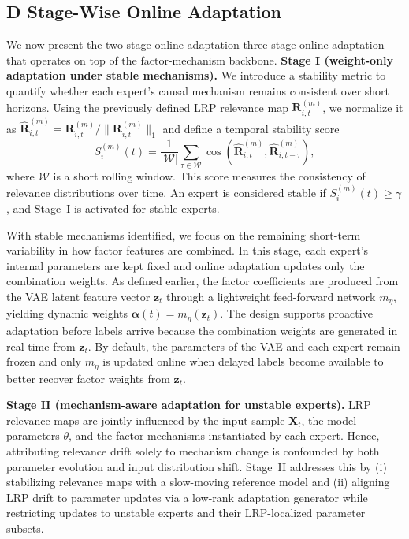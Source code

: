 ﻿\documentclass[journal]{IEEEtran}
\DeclareRobustCommand{\oldtext}[1]{{\color{revisionred}#1}}
\DeclareRobustCommand{\newtext}[1]{{\color{revisionblue}#1}}
\DeclareRobustCommand{\why}[1]{{\color{revisionblue}{\footnotesize (#1)}}}
\DeclareRobustCommand{\rw}[3]{\oldtext{#1} \newtext{#2}\why{#3}}
\begin{document}
\subsection{\rw{D}{Stage-Wise Online Adaptation}{替换占位小节标题。}}
We now present the \rw{two-stage online adaptation}{three-stage online adaptation}{与 Stage I/II/III 结构一致} that operates on top of the factor-mechanism backbone.
\textbf{Stage I (weight-only adaptation under stable mechanisms).}
We introduce a stability metric to quantify whether each expert's causal mechanism remains consistent over short horizons. Using the previously defined LRP relevance map $\mathbf{R}_{i,t}^{(m)}$, we normalize it as $\hat{\mathbf{R}}_{i,t}^{(m)}=\mathbf{R}_{i,t}^{(m)}/\|\mathbf{R}_{i,t}^{(m)}\|_{1}$ and define a temporal stability score
\begin{equation}
S_{i}^{(m)}(t)=\frac{1}{|\mathcal{W}|}\sum_{\tau\in\mathcal{W}} \cos\!\left(\hat{\mathbf{R}}_{i,t}^{(m)},\hat{\mathbf{R}}_{i,t-\tau}^{(m)}\right),
\end{equation}
where $\mathcal{W}$ is a short rolling window. This score measures the consistency of relevance distributions over time. An expert is considered stable if $S_{i}^{(m)}(t)\ge\gamma$, and Stage~I is activated for stable experts.

With stable mechanisms identified, we focus on the remaining short-term variability in how factor features are combined. In this stage, each expert's internal parameters are kept fixed and online adaptation updates only the combination weights. As defined earlier, the factor coefficients are produced from the VAE latent feature vector $\mathbf{z}_t$ through a lightweight feed-forward network $m_{\eta}$, yielding dynamic weights $\boldsymbol{\alpha}(t)=m_{\eta}(\mathbf{z}_t)$.
The design supports proactive adaptation before labels arrive because the combination weights are generated in real time from $\mathbf{z}_t$. By default, the parameters of the VAE and each expert remain frozen and only $m_{\eta}$ is updated online when delayed labels become available to better recover factor weights from $\mathbf{z}_t$.

 \textbf{Stage II (mechanism-aware adaptation for unstable experts).}
LRP relevance maps are jointly influenced by the input sample $\mathbf{X}_t$, the model parameters $\theta$, and the factor mechanisms instantiated by each expert. Hence, attributing relevance drift solely to mechanism change is confounded by both parameter evolution and input distribution shift. Stage~II addresses this by (i) stabilizing relevance maps with a slow-moving reference model and (ii) aligning LRP drift to parameter updates via a low-rank adaptation generator while restricting updates to unstable experts and their LRP-localized parameter subsets.
\end{document}
